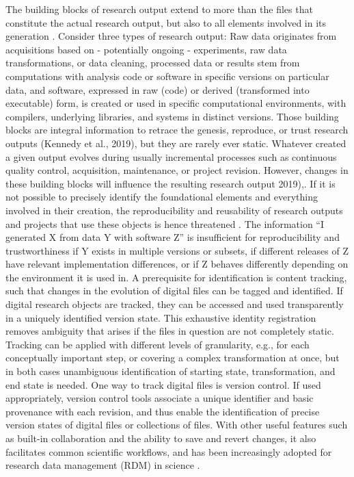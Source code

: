 The building blocks of research output extend to more than the files that constitute the actual research output, but also to all elements involved in its generation \citep{claerbout1992electronic}.
Consider three types of research output: Raw data originates from acquisitions based on - potentially ongoing - experiments, raw data transformations, or data cleaning, processed data or results stem from computations with analysis code or software in specific versions on particular data, and software, expressed in raw (code) or derived (transformed into executable) form, is created or used in specific computational environments, with compilers, underlying libraries, and systems in distinct versions.
Those building blocks are integral information to retrace the genesis, reproduce, or trust research outputs (Kennedy et al., 2019), but they are rarely ever static.
Whatever created a given output evolves during usually incremental processes such as continuous quality control, acquisition, maintenance, or project revision.
However, changes in these building blocks will influence the resulting research output \citep{kennedy2019everything} 2019),\citep{glatard2015reproducibility}.
If it is not possible to precisely identify the foundational elements and everything involved in their creation, the reproducibility and reusability of research outputs and projects that use these objects is hence threatened \citep{kennedy2019everything}.
The information “I generated X from data Y with software Z” is insufficient for reproducibility and trustworthiness if Y exists in multiple versions or subsets, if different releases of Z have relevant implementation differences, or if Z behaves differently depending on the environment it is used in.
A prerequisite for identification is content tracking, such that changes in the evolution of digital files can be tagged and identified. If digital research objects are tracked, they can be accessed and used transparently in a uniquely identified version state.
This exhaustive identity registration removes ambiguity that arises if the files in question are not completely static.
Tracking can be applied with different levels of granularity, e.g., for each conceptually important step, or covering a complex transformation at once, but in both cases unambiguous identification of starting state, transformation, and end state is needed.
One way to track digital files is version control. If used appropriately, version control tools associate a unique identifier and basic provenance with each revision, and thus enable the identification of precise version states of digital files or collections of files. With other useful features such as built-in collaboration and the ability to save and revert changes, it also facilitates common scientific workflows, and has been increasingly adopted for research data management (RDM) in science \citep{nord2019towards} \citep{strupler2017reproducibility} \citep{bryan2018excuse} \citep{corti2019managing}.
